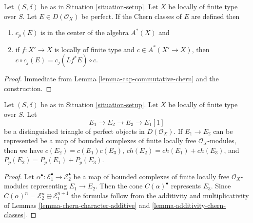 \begin{lemma}
\label{lemma-commutative-chern-perfect}
Let $(S, \delta)$ be as in Situation \ref{situation-setup}.
Let $X$ be locally of finite type over $S$.
Let $E \in D(\mathcal{O}_X)$ be perfect. If the Chern classes
of $E$ are defined then
\begin{enumerate}
\item $c_p(E)$ is in the center of the algebra $A^*(X)$ and
\item if $f : X' \to X$ is locally of finite type and $c \in A^*(X' \to X)$,
then $c \circ c_j(E) = c_j(Lf^*E) \circ c$.
\end{enumerate}
\end{lemma}

\begin{proof}
Immediate from Lemma \ref{lemma-cap-commutative-chern} and the
construction.
\end{proof}

\begin{lemma}
\label{lemma-additivity-on-perfect}
Let $(S, \delta)$ be as in Situation \ref{situation-setup}.
Let $X$ be locally of finite type over $S$. Let
$$
E_1 \to E_2 \to E_3 \to E_1[1]
$$
be a distinguished triangle of perfect objects in $D(\mathcal{O}_X)$.
If $E_1 \to E_2$ can be represented be a map of bounded complexes
of finite locally free $\mathcal{O}_X$-modules, then we have
$c(E_2) = c(E_1) c(E_3)$, $ch(E_2) = ch(E_1) + ch(E_3)$, and
$P_p(E_2) = P_p(E_1) + P_p(E_3)$.
\end{lemma}

\begin{proof}
Let $\alpha^\bullet : \mathcal{E}_1^\bullet \to \mathcal{E}_2^\bullet$
be a map of bounded complexes of finite locally free $\mathcal{O}_X$-modules
representing $E_1 \to E_2$. Then the cone $C(\alpha)^\bullet$
represents $E_3$. Since
$C(\alpha)^n = \mathcal{E}_2^n \oplus \mathcal{E}_1^{n + 1}$
the formulas follow from the additivity and multiplicativity
of Lemmas \ref{lemma-chern-character-additive} and
\ref{lemma-additivity-chern-classes}.
\end{proof}

